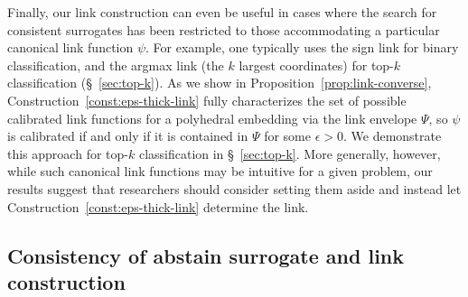 \documentclass[twoside,11pt]{article}
\newcommand{\Comments}{1}
\newcommand{\mynote}[2]{\ifnum\Comments=1\textcolor{#1}{#2}\fi}
\newcommand{\raf}[1]{\mynote{darkgreen}{[RF: #1]}}
\begin{document}
Finally, our link construction can even be useful in cases where the search for consistent surrogates has been restricted to those accommodating a particular canonical link function $\psi$.
For example, one typically uses the sign link for binary classification, and the argmax link (the $k$ largest coordinates) for top-$k$ classification (\S~\ref{sec:top-k}).
As we show in Proposition~\ref{prop:link-converse}, Construction~\ref{const:eps-thick-link} fully characterizes the set of possible calibrated link functions for a polyhedral embedding via the link envelope $\Psi$, so $\psi$ is calibrated if and only if it is contained in $\Psi$ for some $\epsilon>0$.
We demonstrate this approach for top-$k$ classification in \S~\ref{sec:top-k}.
More generally, however, while such canonical link functions may be intuitive for a given problem, our results suggest that researchers should consider setting them aside and instead let Construction~\ref{const:eps-thick-link} determine the link.


\subsection{Consistency of abstain surrogate and link construction}
\label{sec:abstain}
\end{document}

